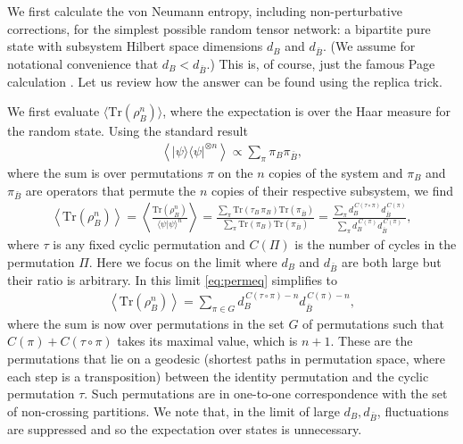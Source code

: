 \documentclass[12pt]{article}
\numberwithin{equation}{section}
\def\tr{\text{Tr}}
\begin{document}
We first calculate the von Neumann entropy, including non-perturbative corrections, for the simplest possible random tensor network: a bipartite pure state with subsystem Hilbert space dimensions $d_B$ and $d_{\bar B}$. (We assume for notational convenience that $d_B < d_{\bar B}$.) This is, of course, just the famous Page calculation \cite{Page:1993df}. Let us review how the answer can be found using the replica trick.

We first evaluate $\langle \tr (\rho_B^n) \rangle$, where the expectation is over the Haar measure for the random state. Using the standard result
\begin{align}
 \left\langle  |\psi \rangle\langle \psi|^{\otimes n}\right \rangle \propto \sum_\pi \pi_B \pi_{\bar B},
\end{align}
where the sum is over permutations $\pi$ on the $n$ copies of the system and $\pi_B$ and $\pi_{\bar B}$ are operators that permute the $n$ copies of their respective subsystem, we find
\begin{align}\label{eq:permeq}
\left\langle \tr (\rho_B^n)\right \rangle =\left \langle \frac{\tr (\rho_B^n)}{\langle\psi | \psi\rangle^n} \right\rangle = \frac{\sum_\pi \tr(\tau_B \,\pi_B) \tr(\pi_{\bar B})}{\sum_\pi \tr(\pi_B) \tr(\pi_{\bar B})} = \frac{\sum_\pi d_B^{\,C(\tau \circ \pi)} d_{\bar B}^{\,C(\pi)}}{\sum_\pi d_B^{\,C(\pi)} d_{\bar B}^{\,C(\pi)}},
\end{align}
where $\tau$ is any fixed cyclic permutation and $C(\Pi)$ is the number of cycles in the permutation $\Pi$. Here we focus on  the limit where $d_B$ and $d_{\bar B}$ are both large but their ratio is arbitrary. In this limit  \ref{eq:permeq} simplifies to
\begin{align} \label{eq:trrhoAn}
\left\langle \tr (\rho_B^n)\right \rangle = \sum_{\pi \in G} d_B^{\,C(\tau \circ \pi) - n} d_{\bar B}^{\,C(\pi) - n},
\end{align}
where the sum is now over permutations in the set $G$ of permutations such that $C(\pi) + C(\tau \circ \pi)$ takes its maximal value, which is $n +1$. These are the permutations that lie on a geodesic (shortest paths in permutation space, where each step is a transposition) between the identity permutation and the cyclic permutation $\tau$. Such permutations are in one-to-one correspondence with the set of non-crossing partitions. We note that, in the limit of large $d_B, d_{\bar{B}}$, fluctuations are suppressed and so the expectation over states is unnecessary. 
\end{document}
